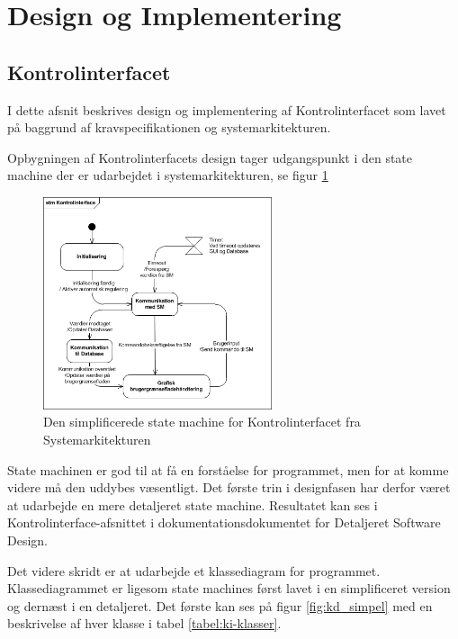 \section{Design og Implementering}
\label{ch:DesignImplementering}

\subsection{Kontrolinterfacet}
I dette afsnit beskrives design og implementering af Kontrolinterfacet som lavet på baggrund af kravspecifikationen og systemarkitekturen. 

Opbygningen af Kontrolinterfacets design tager udgangspunkt i den state machine der er udarbejdet i systemarkitekturen, se figur \ref{fig:KI-stm}

\begin{figure}[htbp]
\centering
\includegraphics[width=0.6\textwidth]{billeder/KI/stm_ki}
\caption{Den simplificerede state machine for Kontrolinterfacet fra Systemarkitekturen}
\label{fig:KI-stm}
\end{figure}

State machinen er god til at få en forståelse for programmet, men for at komme videre må den uddybes væsentligt. Det første trin i designfasen har derfor været at udarbejde en mere detaljeret state machine. Resultatet kan ses i Kontrolinterface-afsnittet i dokumentationsdokumentet for Detaljeret Software Design.

Det videre skridt er at udarbejde et klassediagram for programmet. Klassediagrammet er ligesom state machines først lavet i en simplificeret version og dernæst i en detaljeret. Det første kan ses på figur \ref{fig:kd_simpel} med en beskrivelse af hver klasse i tabel \ref{tabel:ki-klasser}.\\

